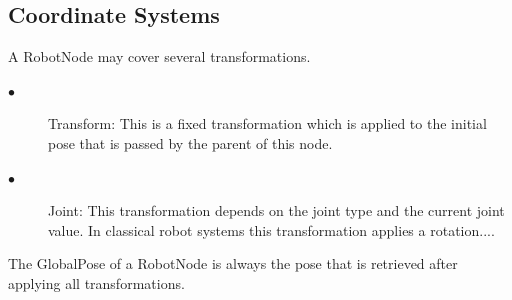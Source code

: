 \documentclass{book}
\begin{document}
\subsection{Coordinate Systems}
\par
A RobotNode may cover several transformations.
\par
\begin{description}
  \item[$\bullet$]Transform: This is a fixed transformation which is applied to the initial pose that is passed by the parent of this node.
    \item[$\bullet$] Joint: This transformation depends on the joint type and the current joint value. In classical robot systems this transformation applies a rotation....
\end{description}
   \par
   The GlobalPose of a RobotNode is always the pose that is retrieved after applying all transformations. 
   \par
\end{document}
